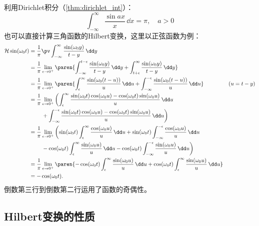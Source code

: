 \begin{example}
    利用Dirichlet积分（\cref{thm:dirichlet_int}）：
    \begin{equation}
        \int_{-\infty}^{\infty}\frac{\sin ax}{x}\,\dd x=\pi,\quad a>0
    \end{equation}
    也可以直接计算三角函数的Hilbert变换，这里以正弦函数为例：
    \begin{align}
        \mathcal{H}\sin(\omega_0 t)&=\frac{1}{\pi}\pv\int_{-\infty}^{\infty}\frac{\sin(\omega_0 y)}{t-y}\,\dd y\nonumber\\
        &=\frac{1}{\pi}\lim_{\epsilon\to 0^+}\paren{\int_{-\infty}^{t-\epsilon}\frac{\sin(\omega_0 y)}{t-y}\,\dd y+\int_{t+\epsilon}^{\infty}\frac{\sin(\omega_0 y)}{t-y}\,\dd y}\nonumber\\
        &=\frac{1}{\pi}\lim_{\epsilon\to 0^+}\paren{\int_{\epsilon}^{\infty}\frac{\sin(\omega_0(t-u))}{u}\,\dd u+\int_{-\infty}^{-\epsilon}\frac{\sin(\omega_0(t-u))}{u}\,\dd u}&(u=t-y)\nonumber\\
        &=\frac{1}{\pi}\lim_{\epsilon\to 0^+}\left(\int_{\epsilon}^{\infty}\frac{\sin(\omega_0 t)\cos(\omega_0 u)-\cos(\omega_0 t)\sin(\omega_0 u)}{u}\,\dd u\right.\nonumber\\
        &\qquad\left.{}+\int_{-\infty}^{-\epsilon}\frac{\sin(\omega_0 t)\cos(\omega_0 u)-\cos(\omega_0 t)\sin(\omega_0 u)}{u}\,\dd u\right)\nonumber\\
        &=\frac{1}{\pi}\lim_{\epsilon\to 0^+}\left(\sin(\omega_0 t)\int_{\epsilon}^{\infty}\frac{\cos(\omega_0 u)}{u}\,\dd u+\sin(\omega_0 t)\int_{-\infty}^{-\epsilon}\frac{\cos(\omega_0 u)}{u}\,\dd u\right.\nonumber\\
        &\qquad\left.{}-\cos(\omega_0 t)\int_{\epsilon}^{\infty}\frac{\sin(\omega_0 u)}{u}\,\dd u-\cos(\omega_0 t)\int_{-\infty}^{-\epsilon}\frac{\sin(\omega_0 u)}{u}\,\dd u\right)\nonumber\\
        &=\frac{1}{\pi}\lim_{\epsilon\to 0^+}\paren{-\cos(\omega_0 t)\int_{\epsilon}^{\infty}\frac{\sin(\omega_0 u)}{u}\,\dd u+\cos(\omega_0 t)\int_{\epsilon}^{\infty}\frac{\sin(\omega_0 u)}{u}\,\dd u}\nonumber\\
        &=-\cos(\omega_0 t).
    \end{align}
    倒数第三行到倒数第二行运用了函数的奇偶性。
\end{example}

\subsection{Hilbert变换的性质}\label{sub:prop_of_hilbert}


